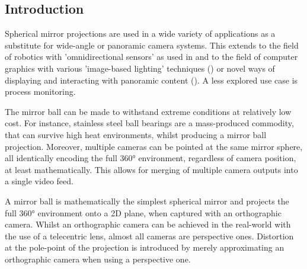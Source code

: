 \documentclass[10pt]{article}
\begin{document}
\begin{multicols}{2}
	\section{Introduction}

	Spherical mirror projections are used in a wide variety of applications as a substitute for wide-angle or panoramic camera systems. This extends to the field of robotics with 'omnidirectional sensors' as used in \cite{omnidirectional} and to the field of computer graphics with various 'image-based lighting' techniques (\cite{lightprobe}) or novel ways of displaying and interacting with panoramic content (\cite{dome}). A less explored use case is process monitoring.

	The mirror ball can be made to withstand extreme conditions at relatively low cost. For instance, stainless steel ball bearings are a mass-produced commodity, that can survive high heat environments, whilst producing a mirror ball projection. Moreover, multiple cameras can be pointed at the same mirror sphere, all identically encoding the full 360° environment, regardless of camera position, at least mathematically. This allows for merging of multiple camera outputs into a single video feed.

	A mirror ball is mathematically the simplest spherical mirror and projects the full 360° environment onto a 2D plane, when captured with an orthographic camera. Whilst an orthographic camera can be achieved in the real-world with the use of a telecentric lens, almost all cameras are perspective ones. Distortion at the pole-point of the projection is introduced by merely approximating an orthographic camera when using a perspective one.


\end{multicols}
\end{document}

